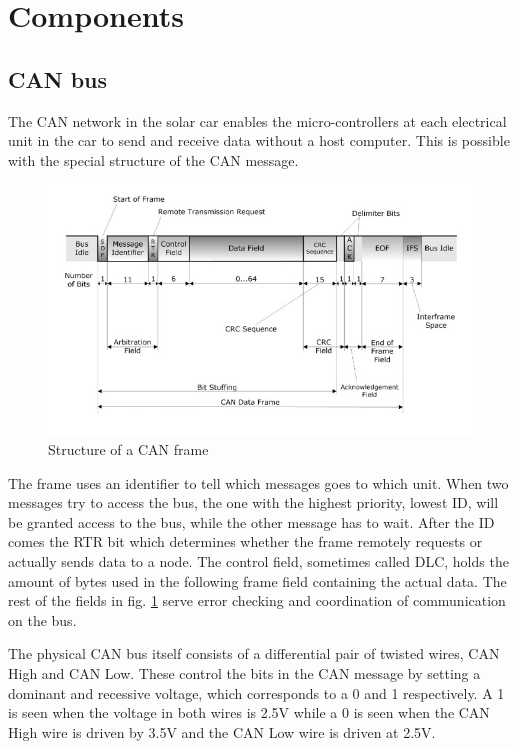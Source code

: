 \documentclass[conference]{IEEEtran}
\begin{document}
\section{Components}
\subsection{CAN bus}
The CAN network in the solar car enables the micro-controllers at each electrical unit in the car to send and receive data without a host computer. This is possible with the special structure of the CAN message.

\begin{figure}[h]
    \centering
    \includegraphics[scale=0.35]{documentation/images/detailed-can-data-frame-architecture.jpg}
    \caption{Structure of a CAN frame}
    \label{fig:CANframe}
\end{figure}

The frame uses an identifier to tell which messages goes to which unit. When two messages try to access the bus, the one with the highest priority, lowest ID, will be granted access to the bus, while the other message has to wait. After the ID comes the RTR bit which determines whether the frame remotely requests or actually sends data to a node. The control field, sometimes called DLC, holds the amount of bytes used in the following frame field containing the actual data. The rest of the fields in fig. \ref{fig:CANframe} serve error checking and coordination of communication on the bus.

The physical CAN bus itself consists of a differential pair of twisted wires, CAN High and CAN Low. These control the bits in the CAN message by setting a dominant and recessive voltage, which corresponds to a 0 and 1 respectively. A 1 is seen when the voltage in both wires is 2.5V while a 0 is seen when the CAN High wire is driven by 3.5V and the CAN Low wire is driven at 2.5V. 
\end{document}
